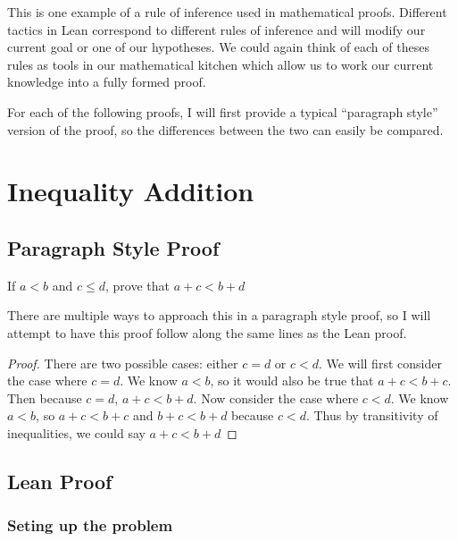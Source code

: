 \documentclass[
  letterpaper,
]{scrreprt}
\newcommand{\excl}[1]{}
\theoremstyle{remark}
\begin{document}
This is one example of a rule of inference used in mathematical proofs.
Different tactics in Lean correspond to different rules of inference and
will modify our current goal or one of our hypotheses. We could again
think of each of theses rules as tools in our mathematical kitchen which
allow us to work our current knowledge into a fully formed proof.

For each of the following proofs, I will first provide a typical
``paragraph style'' version of the proof, so the differences between the
two can easily be compared.

\hypertarget{inequality-addition}{%
\section{Inequality Addition}\label{inequality-addition}}

\hypertarget{paragraph-style-proof}{%
\subsection{Paragraph Style Proof}\label{paragraph-style-proof}}

\begin{thm}
If \(a < b\) and \(c \le d\), prove that \(a + c < b + d\)

\end{thm}

There are multiple ways to approach this in a paragraph style proof, so
I will attempt to have this proof follow along the same lines as the
Lean proof.

\begin{proof}

There are two possible cases: either \(c = d\) or \(c < d\). We will
first consider the case where \(c = d\). We know \(a < b\), so it would
also be true that \(a + c < b + c\). Then because \(c = d\),
\(a + c < b + d\). Now consider the case where \(c < d\). We know
\(a < b\), so \(a + c < b + c\) and \(b + c < b + d\) because \(c < d\).
Thus by transitivity of inequalities, we could say \(a + c < b + d\)
\excl{~□}\qedhere

\end{proof}

\hypertarget{lean-proof}{%
\subsection{Lean Proof}\label{lean-proof}}

\hypertarget{seting-up-the-problem}{%
\subsubsection{Seting up the problem}\label{seting-up-the-problem}}
\end{document}
